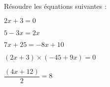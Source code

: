 Résoudre les équations suivantes :

\begin{questions}
	
	\question[2] $2x + 3 = 0$
	
	\fillwithdottedlines{3cm}
	
	\question[2] $5 - 3x = 2x $
	
	\fillwithdottedlines{3cm}
	
	\question[2] $7x + 25 = -8x + 10$
	
	\fillwithdottedlines{3cm}
	
	\question[2] $(2 x + 3) \times (-45 + 9x) = 0 $
	
	\fillwithdottedlines{3.5cm}
	
	\question[2] $\dfrac{(4x + 12)}{2} = 8$
	
	\fillwithdottedlines{3.5cm}
\end{questions}